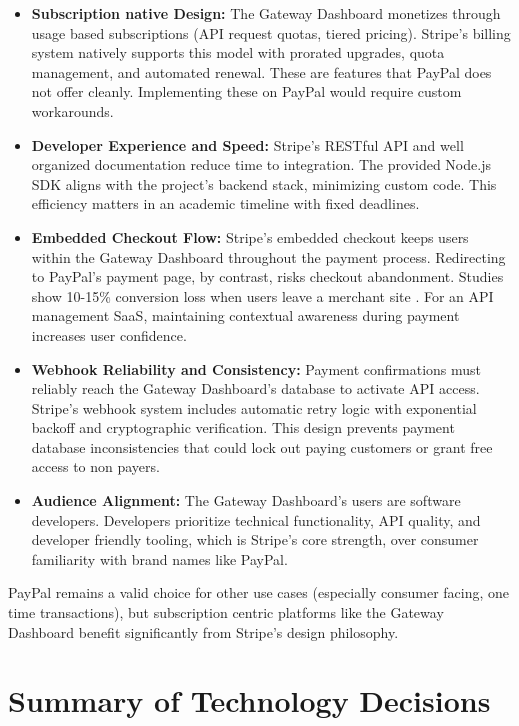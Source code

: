 \begin{itemize}
    \item \textbf{Subscription native Design:} The Gateway Dashboard monetizes through usage based subscriptions (API request quotas, tiered pricing). Stripe's billing system natively supports this model with prorated upgrades, quota management, and automated renewal. These are features that PayPal does not offer cleanly. Implementing these on PayPal would require custom workarounds.

    \item \textbf{Developer Experience and Speed:} Stripe's RESTful API and well organized documentation reduce time to integration. The provided Node.js SDK aligns with the project's backend stack, minimizing custom code. This efficiency matters in an academic timeline with fixed deadlines.

    \item \textbf{Embedded Checkout Flow:} Stripe's embedded checkout keeps users within the Gateway Dashboard throughout the payment process. Redirecting to PayPal's payment page, by contrast, risks checkout abandonment. Studies show 10-15\% conversion loss when users leave a merchant site \cite{baymard2020checkout}. For an API management SaaS, maintaining contextual awareness during payment increases user confidence.

    \item \textbf{Webhook Reliability and Consistency:} Payment confirmations must reliably reach the Gateway Dashboard's database to activate API access. Stripe's webhook system includes automatic retry logic with exponential backoff and cryptographic verification. This design prevents payment database inconsistencies that could lock out paying customers or grant free access to non payers.

    \item \textbf{Audience Alignment:} The Gateway Dashboard's users are software developers. Developers prioritize technical functionality, API quality, and developer friendly tooling, which is Stripe's core strength, over consumer familiarity with brand names like PayPal.
\end{itemize}

PayPal remains a valid choice for other use cases (especially consumer facing, one time transactions), but subscription centric platforms like the Gateway Dashboard benefit significantly from Stripe's design philosophy.

\section{Summary of Technology Decisions}
\label{sec:tech_decisions_summary}

